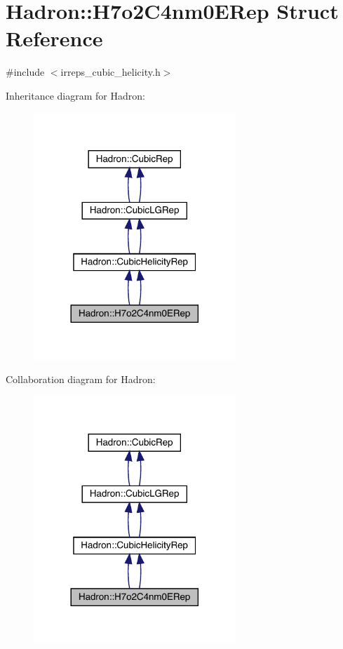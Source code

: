 \hypertarget{structHadron_1_1H7o2C4nm0ERep}{}\section{Hadron\+:\+:H7o2\+C4nm0\+E\+Rep Struct Reference}
\label{structHadron_1_1H7o2C4nm0ERep}


{\ttfamily \#include $<$irreps\+\_\+cubic\+\_\+helicity.\+h$>$}



Inheritance diagram for Hadron\+:\nopagebreak
\begin{figure}[H]
\begin{center}
\leavevmode
\includegraphics[width=216pt]{d0/de7/structHadron_1_1H7o2C4nm0ERep__inherit__graph}
\end{center}
\end{figure}


Collaboration diagram for Hadron\+:\nopagebreak
\begin{figure}[H]
\begin{center}
\leavevmode
\includegraphics[width=216pt]{d0/d12/structHadron_1_1H7o2C4nm0ERep__coll__graph}
\end{center}
\end{figure}
